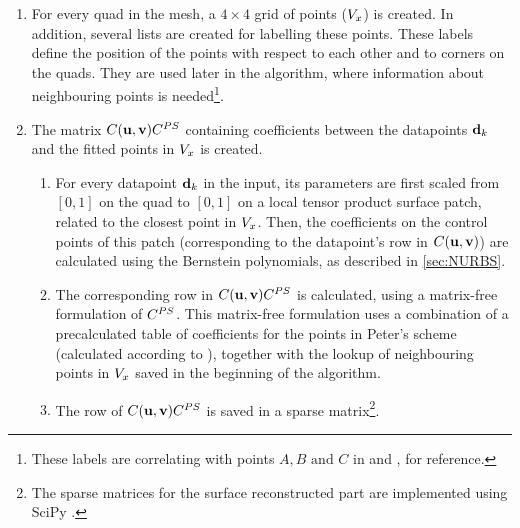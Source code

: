 \begin{enumerate}
\item For every quad in the mesh, a $4 \times 4$ grid of points ($\petersPatchPoints$) is created. In addition, several lists are created for labelling these points. These labels define the position of the points with respect to each other and to corners on the quads. They are used later in the algorithm, where information about neighbouring points is needed\footnote{These labels are correlating with points $A, B \text{ and } C$ in \cite{peters1992constructing} and \cite{eck1996automatic}, for reference.}.
\item The matrix $\lsControlPointCoefMatrix(\vec{u},\vec{v})\lsControlPointCoefMatrix^{PS}$ containing coefficients between the datapoints $\lsDataPoint_k$ and the fitted points in $\petersPatchPoints$ is created.
\begin{enumerate}[label=(\alph*)]
\item For every datapoint $\lsDataPoint_k$ in the input, its parameters are first scaled from $\left[0,1\right]$ on the quad to $\left[0,1\right]$ on a local tensor product \Bez surface patch, related to the closest point in $\petersPatchPoints$. Then, the coefficients on the \Bez control points of this patch (corresponding to the datapoint's row in $\lsControlPointCoefMatrix(\vec{u},\vec{v})$) are calculated using the Bernstein polynomials, as described in \autoref{sec:NURBS}. 
\item The corresponding row in $\lsControlPointCoefMatrix(\vec{u},\vec{v})\lsControlPointCoefMatrix^{PS}$ is calculated, using a matrix-free formulation of $\lsControlPointCoefMatrix^{PS}$. This matrix-free formulation uses a combination of a precalculated table of coefficients for the points in Peter's scheme (calculated according to \cite{eck1996automatic}), together with the lookup of neighbouring points in $\petersPatchPoints$ saved in the beginning of the algorithm. 
\item The row of $\lsControlPointCoefMatrix(\vec{u},\vec{v})\lsControlPointCoefMatrix^{PS}$ is saved in a sparse matrix\footnote{The sparse matrices for the surface reconstructed part are implemented using SciPy \cite{SciPy}.}. 
\end{enumerate}
\end{enumerate}

